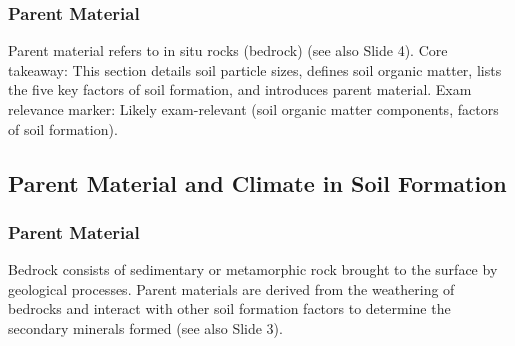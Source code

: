 \subsubsection{Parent Material} Parent material refers to in situ rocks (bedrock) (see also Slide 4).
Core takeaway: This section details soil particle sizes, defines soil organic matter, lists the five key factors of soil formation, and introduces parent material. Exam relevance marker: Likely exam-relevant (soil organic matter components, factors of soil formation).
\subsection{Parent Material and Climate in Soil Formation} \subsubsection{Parent Material} Bedrock consists of sedimentary or metamorphic rock brought to the surface by geological processes. Parent materials are derived from the weathering of bedrocks and interact with other soil formation factors to determine the secondary minerals formed (see also Slide 3).
